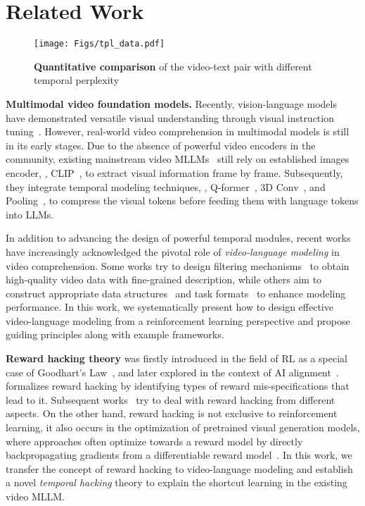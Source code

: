 \section{Related Work}
\label{related_work}

\begin{figure*}[t]
\centering
\texttt{[image: Figs/tpl\_data.pdf]}
\vspace{-8mm}
\caption{\textbf{Quantitative comparison} of the video-text pair with different temporal perplexity}
\label{fig:tpl_data}
\vspace{-6mm}
\end{figure*}

\textbf{Multimodal video foundation models.} Recently, vision-language models~\citep{llava, minigpt4, chatspot, wei2024small, wei2024vary} have demonstrated versatile visual understanding through visual instruction tuning~\citep{llava, minigpt4}. However, real-world video comprehension in multimodal models is still in its early stages. Due to the absence of powerful video encoders in the community, existing mainstream video MLLMs~\citep{llavanext-video, video-llama, videollama2} still rely on established images encoder, \ie, CLIP~\citep{clip}, to extract visual information frame by frame. Subsequently, they integrate temporal modeling techniques, \eg, Q-former~\citep{video-llama}, 3D Conv~\citep{videollama2}, and Pooling~\citep{llavanext-video, pllava}, to compress the visual tokens before feeding them with language tokens into LLMs. 

In addition to advancing the design of powerful temporal modules, recent works have increasingly acknowledged the pivotal role of \textit{video-language modeling} in video comprehension. Some works try to design filtering mechanisms~\citep{wang2024tarsier} to obtain high-quality video data with fine-grained description, while others aim to construct appropriate data structures~\citep{wang2023internvid, wang2024cosmo, chen2023cosa} and task formats~\citep{merlin} to enhance modeling performance. In this work, we systematically present how to design effective video-language modeling from a reinforcement learning perspective and propose guiding principles along with example frameworks.

\textbf{Reward hacking theory} was firstly introduced in the field of RL as a special case of Goodhart's Law~\citep{goodhart1984monetary, leike2018scalable}, and later explored in the context of AI alignment~\citep{leike2017ai}. ~\citep{rewardhacking} formalizes reward hacking by identifying types of reward mis-specifications that lead to it. Subsequent works~\citep{pan2022effects, laidlaw2024preventing} try to deal with reward hacking from different aspects. On the other hand, reward hacking is not exclusive to reinforcement learning, it also occurs in the optimization of pretrained visual generation models, where approaches often optimize towards a reward model by directly backpropagating gradients from a differentiable reward model~\citep{li2024reward, zhang2024large}. In this work, we transfer the concept of reward hacking to video-language modeling and establish a novel \textit{temporal hacking} theory to explain the shortcut learning in the existing video MLLM.